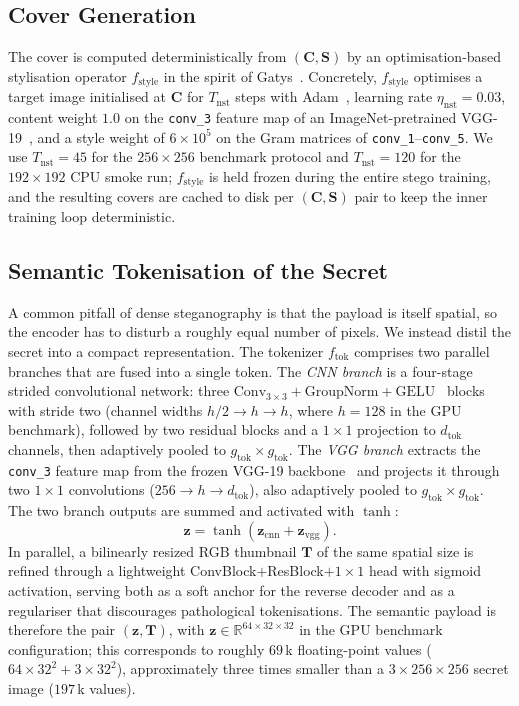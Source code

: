\documentclass[conference]{IEEEtran}
\begin{document}
\subsection{Cover Generation}
\label{sec:cover}
The cover is computed deterministically from $(\mathbf{C},\mathbf{S})$ by an optimisation-based stylisation operator $f_{\text{style}}$ in the spirit of Gatys~\cite{gatys}. Concretely, $f_{\text{style}}$ optimises a target image initialised at $\mathbf{C}$ for $T_{\text{nst}}$ steps with Adam~\cite{adam}, learning rate $\eta_{\text{nst}}\!=\!0.03$, content weight $1.0$ on the \texttt{conv\_3} feature map of an ImageNet-pretrained VGG-19~\cite{vgg}, and a style weight of $6\!\times\!10^{5}$ on the Gram matrices of \texttt{conv\_1}--\texttt{conv\_5}. We use $T_{\text{nst}}\!=\!45$ for the $256\!\times\!256$ benchmark protocol and $T_{\text{nst}}\!=\!120$ for the $192\!\times\!192$ CPU smoke run; $f_{\text{style}}$ is held frozen during the entire stego training, and the resulting covers are cached to disk per $(\mathbf{C},\mathbf{S})$ pair to keep the inner training loop deterministic.

\subsection{Semantic Tokenisation of the Secret}
\label{sec:tok}
A common pitfall of dense steganography is that the payload is itself spatial, so the encoder has to disturb a roughly equal number of pixels. We instead distil the secret into a compact representation. The tokenizer $f_{\text{tok}}$ comprises two parallel branches that are fused into a single token. The \emph{CNN branch} is a four-stage strided convolutional network: three $\text{Conv}_{3{\times}3}{+}\text{GroupNorm}{+}\text{GELU}$~\cite{gelu} blocks with stride two (channel widths $h/2 \!\to\! h \!\to\! h$, where $h\!=\!128$ in the GPU benchmark), followed by two residual blocks and a $1\!\times\!1$ projection to $d_{\text{tok}}$ channels, then adaptively pooled to $g_{\text{tok}}\!\times\!g_{\text{tok}}$. The \emph{VGG branch} extracts the \texttt{conv\_3} feature map from the frozen VGG-19 backbone~\cite{vgg} and projects it through two $1\!\times\!1$ convolutions ($256 \!\to\! h \!\to\! d_{\text{tok}}$), also adaptively pooled to $g_{\text{tok}}\!\times\!g_{\text{tok}}$. The two branch outputs are summed and activated with $\tanh$:
\begin{equation}
    \mathbf{z} = \tanh\!\left(\mathbf{z}_{\text{cnn}} + \mathbf{z}_{\text{vgg}}\right).
    \label{eq:tok}
\end{equation}
In parallel, a bilinearly resized RGB thumbnail $\mathbf{T}$ of the same spatial size is refined through a lightweight ConvBlock$+$ResBlock$+1\!\times\!1$ head with sigmoid activation, serving both as a soft anchor for the reverse decoder and as a regulariser that discourages pathological tokenisations. The semantic payload is therefore the pair $(\mathbf{z},\mathbf{T})$, with $\mathbf{z}\!\in\!\mathbb{R}^{64\times32\times32}$ in the GPU benchmark configuration; this corresponds to roughly $69$\,k floating-point values ($64\!\times\!32^{2}+3\!\times\!32^{2}$), approximately three times smaller than a $3\!\times\!256\!\times\!256$ secret image ($197$\,k values).
\end{document}
